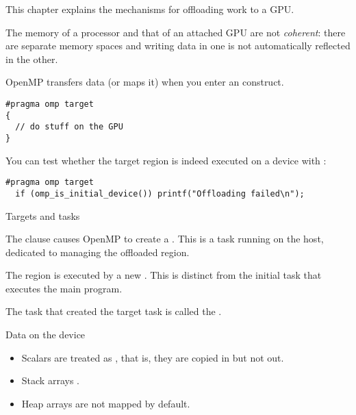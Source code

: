 
This chapter explains the mechanisms for offloading work to a \acf{GPU}.

The memory of a processor and that of an attached \ac{GPU} are not
\emph{coherent}:
there are separate memory spaces and writing data in one
is not automatically reflected in the other.

OpenMP transfers data (or maps it) when you enter an 
construct.
\begin{lstlisting}
#pragma omp target
{
  // do stuff on the GPU
}
\end{lstlisting}

You can test whether the target region is indeed executed on a device
with :
\begin{lstlisting}
#pragma omp target
  if (omp_is_initial_device()) printf("Offloading failed\n");
\end{lstlisting}

 {Targets and tasks}

The  clause causes OpenMP to create a
.
This is a task running on the host, dedicated to managing the
offloaded region.

The  region is executed
by a new .
This is distinct from the initial task that executes the main program.

The task that created the target task is called the
.

 {Data on the device}

\begin{itemize}
\item Scalars are treated as , that is,
  they are copied in but not out.
\item Stack arrays .
\item Heap arrays are not mapped by default.
\end{itemize}

